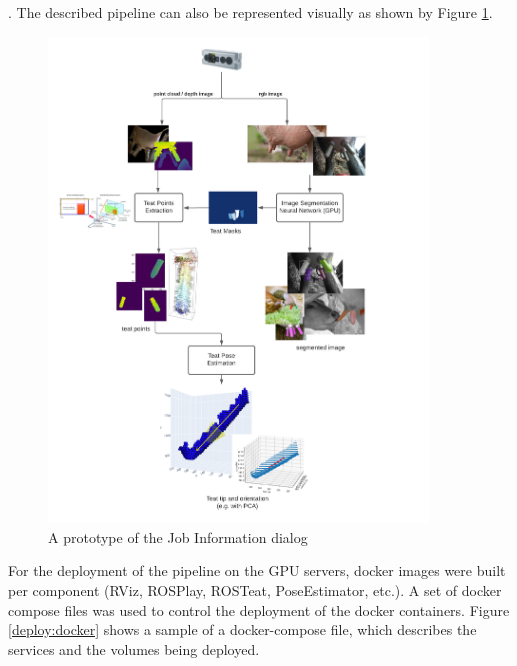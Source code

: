 \lipsum[2]. The described pipeline can also be represented visually as shown by Figure \ref{fig:cow_design}.
\begin{figure}[!ht]
    \centering
    \includegraphics[width=0.9\textwidth]{images/cow_design.png}
    \caption{A prototype of the Job Information dialog}
    \label{fig:cow_design}
\end{figure}



For the deployment of the pipeline on the GPU servers, docker images were built per component (RViz, ROSPlay, ROSTeat, PoseEstimator, etc.). A set of docker compose files was used to control the deployment of the docker containers. Figure \ref{deploy:docker} shows a sample of a docker-compose file, which describes the services and the volumes being deployed.

